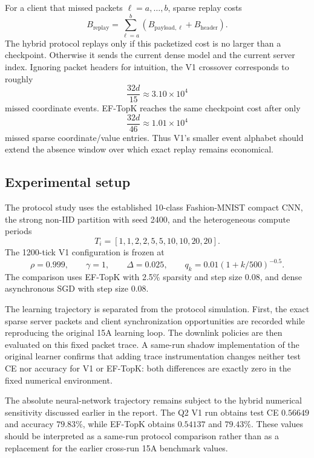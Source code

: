 For a client that missed packets $\ell=a,\ldots,b$, sparse replay costs
\begin{equation}
B_{\mathrm{replay}}=
\sum_{\ell=a}^{b}
\left(B_{\mathrm{payload},\ell}+B_{\mathrm{header}}\right).
\end{equation}
The hybrid protocol replays only if this packetized cost is no larger than a checkpoint. Otherwise it sends the current dense model and the current server index. Ignoring packet headers for intuition, the V1 crossover corresponds to roughly
\begin{equation}
\frac{32d}{15}\approx3.10\times10^4
\end{equation}
missed coordinate events. EF-TopK reaches the same checkpoint cost after only
\begin{equation}
\frac{32d}{46}\approx1.01\times10^4
\end{equation}
missed sparse coordinate/value entries. Thus V1's smaller event alphabet should extend the absence window over which exact replay remains economical.

\subsection{Experimental setup}

The protocol study uses the established 10-class Fashion-MNIST compact CNN, the strong non-IID partition with seed 2400, and the heterogeneous compute periods
\begin{equation}
T_i=[1,1,2,2,5,5,10,10,20,20].
\end{equation}
The 1200-tick V1 configuration is frozen at
\begin{equation}
\rho=0.999,
\qquad
\gamma=1,
\qquad
\Delta=0.025,
\qquad
q_k=0.01(1+k/500)^{-0.5}.
\end{equation}
The comparison uses EF-TopK with 2.5\% sparsity and step size $0.08$, and dense asynchronous SGD with step size $0.08$.

The learning trajectory is separated from the protocol simulation. First, the exact sparse server packets and client synchronization opportunities are recorded while reproducing the original 15A learning loop. The downlink policies are then evaluated on this fixed packet trace. A same-run shadow implementation of the original learner confirms that adding trace instrumentation changes neither test CE nor accuracy for V1 or EF-TopK: both differences are exactly zero in the fixed numerical environment.

The absolute neural-network trajectory remains subject to the hybrid numerical sensitivity discussed earlier in the report. The Q2 V1 run obtains test CE $0.56649$ and accuracy $79.83\%$, while EF-TopK obtains $0.54137$ and $79.43\%$. These values should be interpreted as a same-run protocol comparison rather than as a replacement for the earlier cross-run 15A benchmark values.

